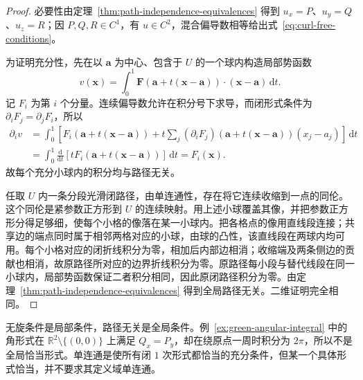 \documentclass[UTF8,12pt,a4paper,fontset=fandol]{ctexbook}
\begin{document}
\begin{proof}
必要性由定理~\ref{thm:path-independence-equivalences} 得到 $u_x=P$、$u_y=Q$、$u_z=R$；因 $P,Q,R\in C^1$，有 $u\in C^2$，混合偏导数相等给出式~\eqref{eq:curl-free-conditions}。

为证明充分性，先在以 $\boldsymbol a$ 为中心、包含于 $U$ 的一个球内构造局部势函数
\[
    v(\boldsymbol x)=\int_0^1
    \boldsymbol F(\boldsymbol a+t(\boldsymbol x-\boldsymbol a))
    \cdot(\boldsymbol x-\boldsymbol a)\,\mathrm dt.
\]
记 $F_i$ 为第 $i$ 个分量。连续偏导数允许在积分号下求导，而闭形式条件为 $\partial_iF_j=\partial_jF_i$，所以
\begin{align*}
    \partial_i v
    &=\int_0^1\left[F_i(\boldsymbol a+t(\boldsymbol x-\boldsymbol a))
      +t\sum_j(\partial_iF_j)(\boldsymbol a+t(\boldsymbol x-\boldsymbol a))(x_j-a_j)\right]\,\mathrm dt\\
    &=\int_0^1\frac{\mathrm d}{\mathrm dt}
      \left[tF_i(\boldsymbol a+t(\boldsymbol x-\boldsymbol a))\right]\,\mathrm dt
      =F_i(\boldsymbol x).
\end{align*}
故每个充分小球内的积分均与路径无关。

任取 $U$ 内一条分段光滑闭路径，由单连通性，存在将它连续收缩到一点的同伦。这个同伦是紧参数正方形到 $U$ 的连续映射。用上述小球覆盖其像，并把参数正方形分得足够细，使每个小格的像落在某一小球内。把各格点的像用直线段连接；共享边的端点同时属于相邻两格对应的小球，由球的凸性，该直线段在两球内均可用。每个小格对应的闭折线积分为零，相加后内部边相消；收缩端及两条侧边的贡献也相消，故原路径所对应的边界折线积分为零。原路径每小段与替代线段在同一小球内，局部势函数保证二者积分相同，因此原闭路径积分为零。由定理~\ref{thm:path-independence-equivalences} 得到全局路径无关。二维证明完全相同。
\end{proof}

\begin{notealert}[type=caution,title={局部微分条件与全局结论}]
无旋条件是局部条件，路径无关是全局条件。例~\ref{ex:green-angular-integral} 中的角形式在 $\mathbb R^2\setminus\{(0,0)\}$ 上满足 $Q_x=P_y$，却在绕原点一周时积分为 $2\pi$，所以不是全局恰当形式。单连通是使所有闭 $1$ 次形式都恰当的充分条件，但某一个具体形式恰当，并不要求其定义域单连通。
\end{notealert}
\end{document}
